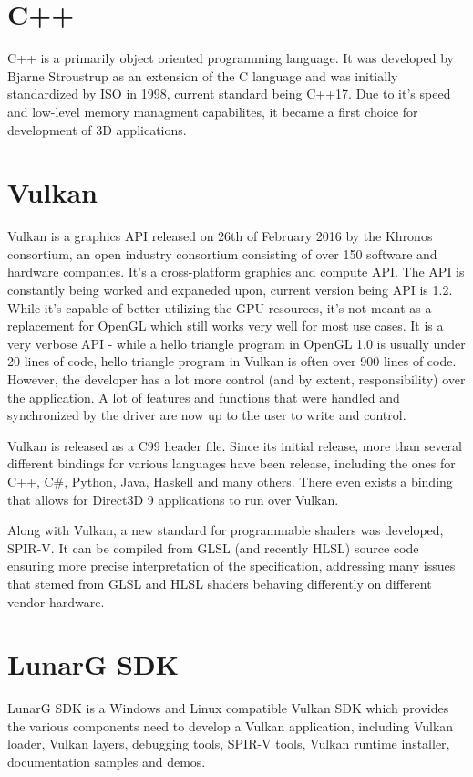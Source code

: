 \documentclass[times, utf8, zavrsni]{fer}
\begin{document}
\section{C++}
C++ is a primarily object oriented programming language. It was developed by Bjarne Stroustrup as an extension of the C language and was initially standardized by ISO in 1998, current standard being C++17. Due to it's speed and low-level memory managment capabilites, it became a first choice for development of 3D applications.

\section{Vulkan}
Vulkan is a graphics API released on 26th of February 2016 by the Khronos consortium, an open industry consortium consisting of over 150 software and hardware companies. It's a cross-platform graphics and compute API. The API is constantly being worked and expaneded upon, current version being API is 1.2. While it’s capable of better utilizing the GPU resources, it’s not meant as a replacement for OpenGL which still works very well for most use cases. It is a very verbose API - while a hello triangle program in OpenGL 1.0 is usually under 20 lines of code, hello triangle program in Vulkan is often over 900 lines of code. However, the developer has a lot more control (and by extent, responsibility) over the application. A lot of features and functions that were handled and synchronized by the driver are now up to the user to write and control.

Vulkan is released as a C99 header file. Since its initial release, more than several different bindings for various languages have been release, including the ones for C++, C\#, Python, Java, Haskell and many others. There even exists a binding that allows for Direct3D 9 applications to run over Vulkan.

Along with Vulkan, a new standard for programmable shaders was developed, SPIR-V. It can be compiled from GLSL (and recently HLSL) source code ensuring more precise interpretation of the specification, addressing many issues that stemed from GLSL and HLSL shaders behaving differently on different vendor hardware. 

\section{LunarG SDK}
LunarG SDK is a Windows and Linux compatible Vulkan SDK which provides the various components need to develop a Vulkan application, including Vulkan loader, Vulkan layers, debugging tools, SPIR-V tools, Vulkan runtime installer, documentation samples and demos.
\end{document}
